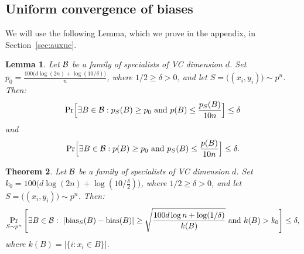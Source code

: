 \documentclass{article}
\newtheorem{theorem}{Theorem}[section]
\newtheorem{lemma}[theorem]{Lemma}
\newcommand{\B}{{\cal B}}
\newcommand{\bias}{\text{bias}}
\newcommand{\samp}{S}
\newcommand{\eps}{\epsilon}
\begin{document}
\subsection{Uniform convergence of biases}

We will use the following Lemma, which we prove in the appendix, in Section~\ref{sec:auxuc}.
\begin{lemma}\label{lem:auxuc}
Let $\B$ be a family of specialists of VC dimension $d$.
Set $p_0 = \frac{100\bigl(d\log(2n) + \log(10/\delta)\bigr)}{n}$, 
where $1/2\geq \delta>0$,
and let $S=\bigl((x_i,y_i)\bigr) \sim p^n$.
Then:
\[
\Pr
\Bigl[
\exists {B\in\B}: p_{\samp}(B) \geq p_0 \mbox{ and } p(B) \leq \frac{p_{\samp}(B)}{10n}
\Bigr]\leq \delta
\]
and
\[
\Pr
\Bigl[
\exists {B\in\B}: p(B) \geq p_0 \mbox{ and } p_{\samp}(B) \leq \frac{p(B)}{10n}
\Bigr]\leq \delta.
\]


\end{lemma}

\begin{theorem}
Let $\B$ be a family of specialists of VC dimension $d$.
Set $k_0 = 100\bigl(d\log(2n) + \log(10/\frac{\delta}{2})\bigr)$, where
 $1/2\geq \delta>0$,
and let $S=\bigl((x_i,y_i)\bigr) \sim p^n$.
Then:
\[\Pr_{\samp\sim p^n}\left[\exists {B\in\B}:~\lvert
  \bias_{\samp}(B) -  \bias(B)\rvert \geq \sqrt{\frac{100d\log n +
      \log(1/\delta)}{k(B)} }
  \mbox{ and } k(B)>k_0
  \right] \leq \delta,
\]
where $k(B) = \lvert\{ i : x_i\in B \}\rvert$.
\end{theorem}
\end{document}
